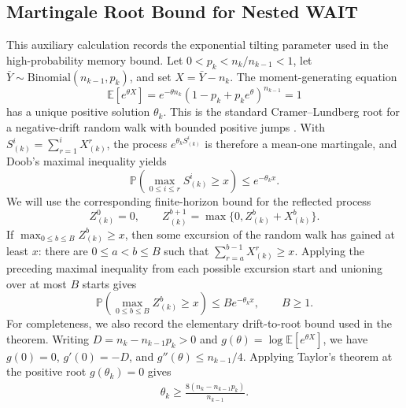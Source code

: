 \subsection{Martingale Root Bound for Nested WAIT}\label{appendix_lemma::proof of solution to martingale exists}
This auxiliary calculation records the exponential tilting parameter used in the high-probability memory bound. Let \(0<p_k<n_k/n_{k-1}<1\), let \(\bar Y\sim\mathrm{Binomial}(n_{k-1},p_k)\), and set \(X=\bar Y-n_k\). The moment-generating equation
\[
    \mathbb{E}[e^{\theta X}]
    =
    e^{-\theta n_k}(1-p_k+p_ke^{\theta})^{n_{k-1}}
    =
    1
\]
has a unique positive solution \(\theta_k\). This is the standard Cramer--Lundberg root for a negative-drift random walk with bounded positive jumps \citep[see, e.g.,][]{asmussen2003applied}. With \(S^i_{(k)}=\sum_{r=1}^i X^r_{(k)}\), the process \(e^{\theta_k S^i_{(k)}}\) is therefore a mean-one martingale, and Doob's maximal inequality \citep[see, e.g.,][]{durrett2019probability} yields
\[
    \mathbb{P}\left(\max_{0\le i\le r}S^i_{(k)}\ge x\right)
    \le e^{-\theta_k x}.
\]
We will use the corresponding finite-horizon bound for the reflected process
\[
    Z^0_{(k)}=0,\qquad
    Z^{b+1}_{(k)}=\max\{0,Z^b_{(k)}+X^b_{(k)}\}.
\]
If \(\max_{0\le b\le B}Z^b_{(k)}\ge x\), then some excursion of the random walk has gained at least \(x\): there are \(0\le a<b\le B\) such that \(\sum_{r=a}^{b-1}X^r_{(k)}\ge x\). Applying the preceding maximal inequality from each possible excursion start and unioning over at most \(B\) starts gives
\[
    \mathbb{P}\left(\max_{0\le b\le B}Z^b_{(k)}\ge x\right)
    \le B e^{-\theta_k x},\qquad B\ge1.
\]
For completeness, we also record the elementary drift-to-root bound used in the theorem. Writing \(D=n_k-n_{k-1}p_k>0\) and \(g(\theta)=\log\mathbb{E}[e^{\theta X}]\), we have \(g(0)=0\), \(g'(0)=-D\), and \(g''(\theta)\le n_{k-1}/4\). Applying Taylor's theorem at the positive root \(g(\theta_k)=0\) gives
\begin{align}
    \theta_k \geq \frac{8 (n_k - n_{k-1} p_k)}{n_{k-1}}.\label{eq::theta lower bound}
\end{align}

